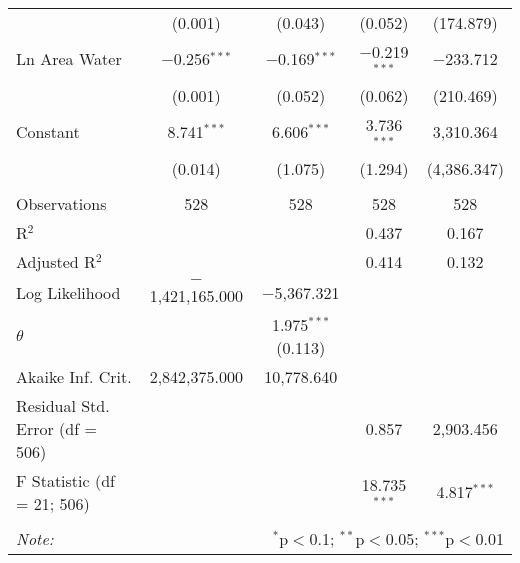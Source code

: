 \begin{table}[!htbp]
\begin{tabular}{@{\extracolsep{5pt}}lcccc}
  & (0.001) & (0.043) & (0.052) & (174.879) \\ 
  Ln Area Water & $-$0.256$^{***}$ & $-$0.169$^{***}$ & $-$0.219$^{***}$ & $-$233.712 \\ 
  & (0.001) & (0.052) & (0.062) & (210.469) \\ 
  Constant & 8.741$^{***}$ & 6.606$^{***}$ & 3.736$^{***}$ & 3,310.364 \\ 
  & (0.014) & (1.075) & (1.294) & (4,386.347) \\ 
 \hline \\[-1.8ex] 
Observations & 528 & 528 & 528 & 528 \\ 
R$^{2}$ &  &  & 0.437 & 0.167 \\ 
Adjusted R$^{2}$ &  &  & 0.414 & 0.132 \\ 
Log Likelihood & $-$1,421,165.000 & $-$5,367.321 &  &  \\ 
$\theta$ &  & 1.975$^{***}$  (0.113) &  &  \\ 
Akaike Inf. Crit. & 2,842,375.000 & 10,778.640 &  &  \\ 
Residual Std. Error (df = 506) &  &  & 0.857 & 2,903.456 \\ 
F Statistic (df = 21; 506) &  &  & 18.735$^{***}$ & 4.817$^{***}$ \\ 
\hline 
\hline \\[-1.8ex] 
\textit{Note:}  & \multicolumn{4}{r}{$^{*}$p$<$0.1; $^{**}$p$<$0.05; $^{***}$p$<$0.01} \\ 
\end{tabular} 
\end{table} 
